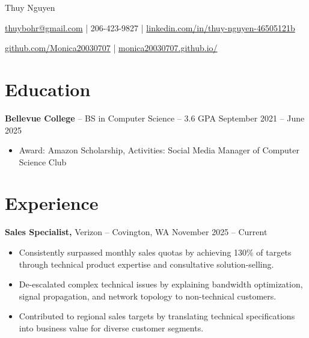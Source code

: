 \documentclass[11pt]{article}       %
\begin{document}
\centerline{\Huge Thuy Nguyen}

\vspace{5pt}

\centerline{\href{mailto:thuybohr@gmail.com}{thuybohr@gmail.com} | 206-423-9827 |
\href{https://www.linkedin.com/in/thuy-nguyen-46505121b/}{linkedin.com/in/thuy-nguyen-46505121b}}

\centerline{\href{https://github.com/Monica20030707}{github.com/Monica20030707} | 
\href{https://monica20030707.github.io/}{monica20030707.github.io/}} 

\vspace{-9pt}

\section*{Education}
\textbf{Bellevue College} -- BS in Computer Science -- 3.6 GPA \hfill September 2021 -- June 2025\\
\vspace{-9pt}
\begin{itemize}
  \item Award: Amazon Scholarship, Activities: Social Media Manager of Computer Science Club
\end{itemize}

\vspace{-18.5pt}

\section*{Experience}

\textbf{Sales Specialist,} {Verizon} -- Covington, WA \hfill November 2025 -- Current \\
\vspace{-9pt}
\begin{itemize}
  \item Consistently surpassed monthly sales quotas by achieving 130\% of targets through technical product expertise and consultative solution-selling.
  \item De-escalated complex technical issues by explaining bandwidth optimization, signal propagation, and network topology to non-technical customers.
  \item Contributed to regional sales targets by translating technical specifications into business value for diverse customer segments.
\end{itemize}
\end{document}
